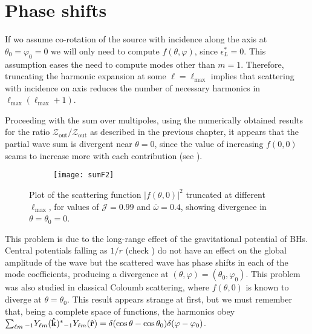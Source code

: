 
\section{Phase shifts}

If wo assume co-rotation of the source with incidence along the axis at $\theta_0=\varphi_0=0$ we will only need to compute $f(\theta,\varphi)$, since $\epsilon_L^*=0$.
This assumption eases the need to compute modes other than $m=1$.
Therefore, truncating the harmonic expansion  at some $\ell=\ell_{\max}$ implies that scattering with incidence on axis reduces the number of necessary harmonics in $\ell_{\max}(\ell_{\max} + 1)$.

Proceeding with the sum over multipoles, using the numerically obtained results for the ratio $\mathscr{Z}_\mathrm{out}/\mathscr{Z}_\mathrm{out}$ as described in the previous chapter, it appears that the partial wave sum is divergent near $\theta = 0$, since the value of increasing $f(0,0)$ seams to increase more with each contribution (see ).
\begin{figure}[h]
	\centering
	\vspace{0.2cm}
	\begin{subfigure}[c]{0.6\textwidth}
        \texttt{[image: sumF2]}
	\end{subfigure}
	\caption{Plot of the scattering function $|f(\theta,0)|^2$ truncated at different $\ell_\mathrm{max}$, for values of $\mathscr{J}=0.99$ and $\bar{\omega}=0.4$, showing divergence in $\theta=\theta_0=0$.} 
	\label{fig5:sumF}
\end{figure}
This problem is due to the long-range effect of the gravitational potential of BHs. Central potentials falling as $1/r$ (check ) do not have an effect on the global amplitude of the wave but the scattered wave has phase shifts in each of the mode coefficients, producing a divergence at $(\theta,\varphi)=(\theta_0,\varphi_0)$.
This problem was also studied in classical Coloumb scattering, where $f(\theta,0)$ is known to diverge at $\theta=\theta_0$.
This result appears strange at first, but we must remember that, being a complete space of functions, the harmonics obey $\sum_{\ell m} \uu[-1]{Y}{\ell m}(\mathbf{\hat{k}})^{*} \uu[-1]{Y}{\ell m}(\mathbf{\hat{r}}) = \delta(\cos\theta - \cos\theta_0) \delta(\varphi - \varphi_0)$.

